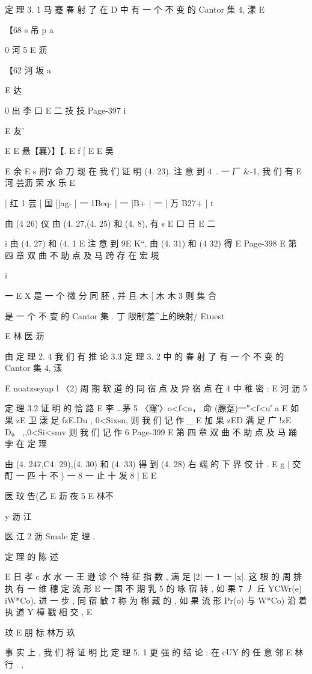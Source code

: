 {{{{{{{{{{{{定 理 3. 1 马 蹇 春 射 了 在 D 中 有 一 个 不 变 的 Cantor 集 4, 漾
E

【68 s 吊 p a

0 河 5
E 沥

【62 河 坂 a

E 达

0 出 李 口
E 二 技 技
Page-397
i

E 友'}
E
E 悬【襄〉】【.
E f
[
E
E 吴

E 余
E
s 刑7 命 刀
现 在 我 们 证 明 (4. 23). 注 意 到 4~. 一 厂 &-1, 我 们 有
E 河 芸沥 荣 水 乐
E

| 红 1 芸 | 国 [|ag- | 一 1Beq- | 一 |B+ | 一 | 万 B27+ |
t

由 (4 26)
仪
由 (4. 27,(4. 25) 和 (4. 8), 有
s
E 口 日
E 二

i
由 (4. 27) 和 (4. 1
E
注 意 到 9E K“, 由 (4. 31) 和 (4 32) 得
E
Page-398
E 第 四 章 双 曲 不 助 点 及 马 跨 存 在 宏 境

i

一 E X 是 一 个 微 分 同 胚 , 并 且
木
[ 木
木
3
则 集 合

是 一 个 不 变 的 Cantor 集 . 丁 限制′羞^上的映射/ Etuest

E 林
医 沥

由 定 理 2. 4 我 们 有
推 论 3.3 定 理 3. 2 中 的 春 射 了 有 一 个 不 变 的 Cantor 集 4, 漾

E
noatzseyap l
〈2) 周 期 软 道 的 同 宿 点 及 异 宿 点 在 4 中 稚 密 :
E 河 沥 5

定 理 3.2 证 明 的 恰 路
E 李
…茅 5 〈窿′〉o<f<n， 命 (膘趸)一″<f<u′
a E
如 果 zE 卫 漾 足 fzE.Du , 0<Sixsn, 则 我 们 记 作
_ E
加 果 zED 满 足 广 !zE D。 ,,0<Si<smv 则 我 们 记 作
6
Page-399
E 第 四 章 双 曲 不 助 点 及 马 踊 孛 在 定 理

由 (4. 247,C4. 29),(4. 30) 和 (4. 33) 得 到 (4. 28) 右 端 的 下 界 佼 计 .
E
g | 交 酊 一 匹 十 不 ) 一 8 一 止 十 发 8 |
E
E

医 玟 告(乙 E 沥 夜 5
E 林不

y 沥 江

医 江 2 沥
Smale 定 理 .

定 理 的 陈 述

E 日 孝 c 水 水 一 王 逊 诊
个 特 征 指 数 , 满 足 |2| 一 1 一 |x|. 这 根 的 周 排 执 有 一 维 穗 定 流 形
E 一 国 不
期 乳 5 的 咏 宿 转 , 如 果 7 丿 丘 YCWr(e) iW*Co). 进 一 步 , 同 宿
敏 7 称 为 槲 藏 的 , 如 果 流 形 Pr(o) 与 W*Co) 沿 着 执 道 Y 樟 戳 相 交 ,
E

玟
E
朋 标 林万 玖

事 实 上 , 我 们 将 证 明 比 定 理 5. 1 更 强 的 结 论 : 在 cUY 的 任 意 邻
E 林
行 . ,

}}}}}}}}}}}
